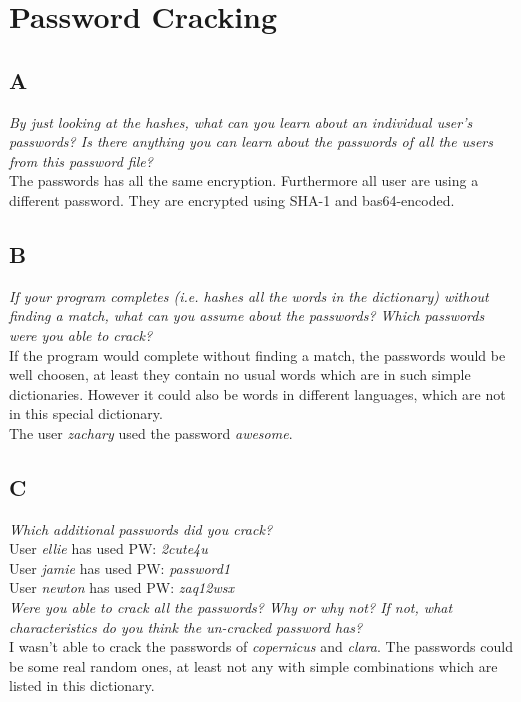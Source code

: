 \section{Password Cracking}


\subsection{A}

\textit{By just looking at the hashes, what can you learn about an individual user’s passwords? Is there anything you can learn about the passwords of all the users from this password file?}\\
The passwords has all the same encryption. Furthermore all user are using a different password. They are encrypted using SHA-1 and bas64-encoded.


\subsection{B}

\textit{If your program completes (i.e. hashes all the words in the dictionary) without finding a match, what can you assume about the passwords? Which passwords were you able to crack?}\\
If the program would complete without finding a match, the passwords would be well choosen, at least they contain no usual words which are in such simple dictionaries. However it could also be words in different languages, which are not in this special dictionary.\\
The user \textit{zachary} used the password \textit{awesome}.\\


\subsection{C}

\textit{Which additional passwords did you crack?}\\
User \textit{ellie} has used PW: \textit{2cute4u}\\
User \textit{jamie} has used PW: \textit{password1}\\
User \textit{newton} has used PW: \textit{zaq12wsx}\\

\textit{Were you able to crack all the passwords? Why or why not? If not, what characteristics do you think the un-cracked password has?}\\
I wasn't able to crack the passwords of \textit{copernicus} and \textit{clara}. The passwords could be some real random ones, at least not any with simple combinations which are listed in this dictionary.\\


